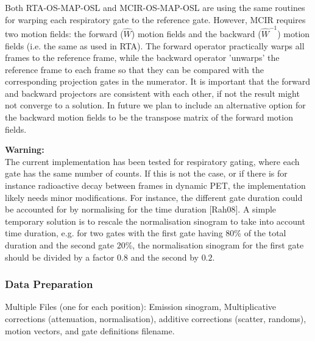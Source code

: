 \documentclass{article}
\begin{document}
Both RTA-OS-MAP-OSL and MCIR-OS-MAP-OSL are using the same routines for warping each respiratory gate to
the reference gate. However, MCIR requires two motion fields: the forward ($\hat{W}$) motion fields and the
backward ($\hat{W}^{-1}$) motion fields (i.e. the same as used in RTA). The forward operator practically warps all
frames to the reference frame, while the backward operator 'unwarps' the reference frame to each frame so
that they can be compared with the corresponding projection gates in the numerator. It is important that
the forward and backward projectors are consistent with each other, if not the result might not converge
to a solution. In future we plan to include an alternative option for the backward motion fields to be
the transpose matrix of the forward motion fields.

\noindent \textbf{Warning:}\\
The current implementation has been tested for respiratory gating, where each gate has the same number of
counts. If this is not the case, or if there is for instance radioactive decay between frames in dynamic
PET, the implementation likely needs minor modifications. For instance, the different gate duration could
be accounted for by normalising for the time duration [Rah08].
A simple temporary solution is to rescale the
normalisation sinogram to take into account time duration, e.g. for two
gates with the first gate having $80$\% of the total duration and the second
gate $20$\%, the normalisation sinogram for the first gate should be divided
by a factor $0.8$ and the second by $0.2$.



\subsubsection{Data Preparation}

Multiple
Files (one for each position): Emission sinogram, Multiplicative corrections
(attenuation, normalisation), additive corrections (scatter, randoms), motion
vectors, and gate definitions filename.
\end{document}
